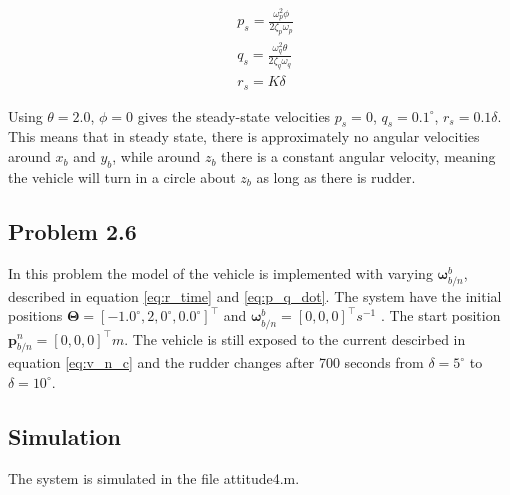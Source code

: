 \begin{equation}
\begin{aligned}
	& p_s = \frac{\omega_p^2 \phi}{ 2\zeta_p\omega_p} \\
	& q_s = \frac{\omega_q^2 \theta}{2\zeta_q\omega_q} \\
	& r_s = K \delta
	\label{eq:p_q_dot}
\end{aligned}
\end{equation}

Using $\theta = 2.0$, $\phi = 0$ gives the steady-state velocities $p_s = 0$, $q_s = 0.1 ^\circ$, $r_s = 0.1 \delta$. This means that in steady state, there is approximately no angular velocities around $x_b$ and $y_b$, while around $z_b$ there is a constant angular velocity, meaning the vehicle will turn in a circle about $z_b$ as long as there is rudder. 

\subsection*{Problem 2.6}

In this problem the model of the vehicle is implemented with varying $\boldsymbol{\omega}^b_{b/n}$, described in equation \eqref{eq:r_time} and \eqref{eq:p_q_dot}. The system have the initial positions $\boldsymbol{\Theta} = [-1.0^\circ, 2,0^\circ, 0.0^\circ]^\top$ and $\boldsymbol{\omega}^b_{b/n} = [0,0,0]^\top s^{-1}$ . The start position $\mathbf{p}^n_{b/n} = [0,0,0]^\top m$. The vehicle is still exposed to the current descirbed in equation \eqref{eq:v_n_c}  and the rudder changes after 700 seconds from $\delta = 5^\circ$ to $\delta = 10^\circ$.

\subsection{Simulation}

The system is simulated in the file {\color{\blue} attitude4.m}. 


